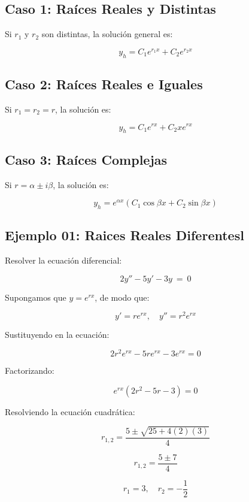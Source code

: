 \subsection*{Caso 1: Raíces Reales y Distintas}
Si \( r_1 \) y \( r_2 \) son distintas, la solución general es:

\begin{equation}
y_h = C_1 e^{r_1 x} + C_2 e^{r_2 x}
\end{equation}

\subsection*{Caso 2: Raíces Reales e Iguales}
Si \( r_1 = r_2 = r \), la solución es:

\begin{equation}
y_h = C_1 e^{rx} + C_2 x e^{rx}
\end{equation}

\subsection*{Caso 3: Raíces Complejas}
Si \( r = \alpha \pm i\beta \), la solución es:

\begin{equation}
y_h = e^{\alpha x} \left( C_1 \cos \beta x + C_2 \sin \beta x \right)
\end{equation}


\subsection{Ejemplo 01: Raices Reales Diferentesl}

Resolver la ecuación diferencial:

\[
2y''-5y'-3y\ =\ 0
\]

Supongamos que \( y = e^{r x} \), de modo que:

\[
y' = r e^{r x}, \quad y'' = r^2 e^{r x}
\]

Sustituyendo en la ecuación:

\[
2r^{2} e^{r x} -5r e^{r x} -3 e^{r x} = 0
\]

Factorizando:

\[
e^{r x}( 2r^{2} -5r-3) = 0
\]

Resolviendo la ecuación cuadrática:

\[
r_{1,2} = \frac{5\pm \sqrt{25+4(2)(3)}}{4}
\]

\[
r_{1,2} = \frac{5\pm 7}{4}
\]

\[
r_{1} =3, \quad r_{2} = -\frac{1}{2}
\]


